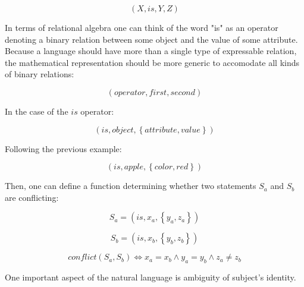 $$
    \left( X, is, Y, Z \right)
$$

In terms of relational algebra one can think of the word "is" as an operator denoting a binary relation between some object and the value of some attribute.
Because a language should have more than a single type of expressable relation, the mathematical representation should be more generic to accomodate all kinds of binary relations:

$$
    \left( operator, first, second \right)
$$

In the case of the $is$ operator:

$$
    \left( is, object, \left\{ attribute, value \right\} \right)
$$

Following the previous example:

$$
    \left( is, apple, \left\{ color, red \right\} \right)
$$

Then, one can define a function determining whether two statements $S_a$ and $S_b$ are conflicting:

$$
    S_a = \left( is, x_a, \left\{ y_a, z_a \right\} \right)
$$

$$
    S_b = \left( is, x_b, \left\{ y_b, z_b \right\} \right)
$$

$$
    conflict \left( S_a, S_b \right) \iff x_a = x_b \land y_a = y_b \land z_a \neq z_b
$$

One important aspect of the natural language is ambiguity of subject's identity.